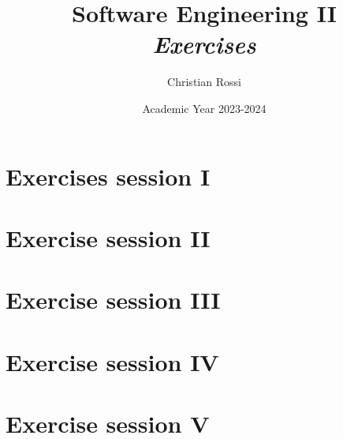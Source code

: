 \documentclass[12pt, a4paper]{report}
\title{Software Engineering II\\ \textit{Exercises}}
\author{Christian Rossi}
\date{Academic Year 2023-2024}
\begin{document}
    \maketitle

    \newpage

    

    \cleardoublepage

    \tableofcontents

    \cleardoublepage

    \chapter{Exercises session I}
    
    

    \chapter{Exercise session II}
    
    

    \chapter{Exercise session III}
    
    

    \chapter{Exercise session IV}
    
    
    

    \chapter{Exercise session V}
    
\end{document}
